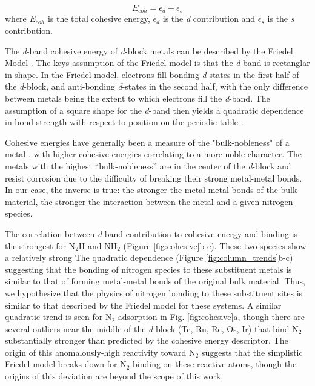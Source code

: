 \begin{equation}
    E_{coh} = \epsilon_d + \epsilon_s
    \label{eq:cohesive}
\end{equation}
where $E_{coh}$ is the total cohesive energy, $\epsilon_d$ is the \textit{d} contribution and $\epsilon_s$ is the \textit{s} contribution.

The \textit{d}-band cohesive energy of \textit{d}-block metals can be described by the Friedel Model \cite{1969TPom}. The keys assumption of the Friedel model is that the \textit{d}-band is rectanglar in shape. In the Friedel model, electrons fill bonding \textit{d}-states in the first half of the \textit{d}-block, and anti-bonding \textit{d}-states in the second half, with the only difference between metals being the extent to which electrons fill the \textit{d}-band. The assumption of a square shape for the \textit{d}-band then yields a quadratic dependence in bond strength with respect to position on the periodic table \cite{1969TPom}.%

Cohesive energies have generally been a measure of the "bulk-nobleness" of a metal \cite{Hammer_1995}, with higher cohesive energies correlating to a more noble character. The metals with the highest ``bulk-nobleness'' are in the center of the \textit{d}-block and resist corrosion due to the difficulty of breaking their strong metal-metal bonds. In our case, the inverse is true: the stronger the metal-metal bonds of the bulk material, the stronger the interaction between the metal and a given nitrogen species.

The correlation between \textit{d}-band contribution to cohesive energy and binding is the strongest for N$_2$H and NH$_2$ (Figure \ref{fig:cohesive}b-c). These two species show a relatively strong The quadratic dependence (Figure \ref{fig:column_trends}b-c) suggesting that the bonding of nitrogen species to these substituent metals is similar to that of forming metal-metal bonds of the original bulk material. Thus, we hypothesize that the physics of nitrogen bonding to these substituent sites is similar to that described by the Friedel model for these systems.
A similar quadratic trend is seen for N$_2$ adsorption in Fig. \ref{fig:cohesive}a, though there are several outliers near the middle of the \textit{d}-block (Tc, Ru, Re, Os, Ir) that bind N$_2$ substantially stronger than predicted by the cohesive energy descriptor. The origin of this anomalously-high reactivity toward N$_2$ suggests that the simplistic Friedel model breaks down for N$_2$ binding on these reactive atoms, though the origins of this deviation are beyond the scope of this work.

